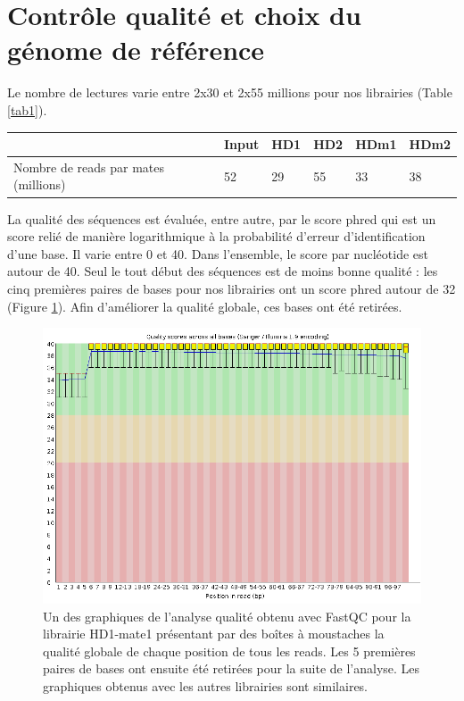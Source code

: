 \documentclass[a4paper,12pt,times]{report}
\newcommand{\scaption}[1]{\caption{\footnotesize{#1}}}
\begin{document}
    \section{Contrôle qualité et choix du génome de référence}\label{Test}
    Le nombre de lectures varie entre 2x30 et 2x55 millions pour nos librairies  (Table \ref{tab1}). 
 \begin{center}
 \begin{tabular}{|p{4cm}|p{2cm}|p{2cm}|p{2cm}|p{2cm}|p{2cm}|}
\hline
  & Input &HD1 & HD2 &  HDm1 & HDm2 \\
\hline
Nombre de reads par mates (millions) & 52 &  29 & 55 & 33 & 38   \\
\hline
\end{tabular}
\label{tab1}
\end{center}

La qualité des séquences est évaluée, entre autre, par le score phred qui est un score relié de manière logarithmique à la probabilité d'erreur d'identification d'une base. Il varie entre 0 et 40. 
 Dans l'ensemble, le score par nucléotide est autour de 40.  Seul le tout début des séquences est de moins bonne qualité : les cinq premières paires de bases pour nos librairies ont un score phred autour de 32 (Figure \ref{fastqc}). Afin d'améliorer la qualité globale, ces bases ont été retirées.
    
\begin{figure}[!h]
\centering
\includegraphics[scale=0.6]{fastqc.png}
\scaption{Un des graphiques de l'analyse qualité obtenu avec FastQC pour la librairie HD1-mate1 présentant par des boîtes à moustaches la qualité globale de chaque position de tous les reads. Les 5 premières paires de bases ont ensuite été retirées pour la suite de l'analyse. Les graphiques obtenus avec les autres librairies sont similaires.}
\label{fastqc}
\end{figure}
\end{document}
